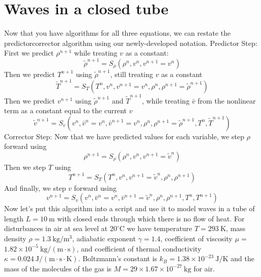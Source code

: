 \section*{Waves in a closed tube}

Now that you have algorithms for all three equations, we can restate the predictorcorrector algorithm using our newly-developed notation.
Predictor Step: First we predict $\rho^{n+1}$ while treating $v$ as a constant:
$$
\tilde{\rho}^{n+1}=S_{\rho}\left(\rho^{n}, v^{n}, v^{n+1}=v^{n}\right)
$$
Then we predict $T^{n+1}$ using $\tilde{\rho}^{n+1}$, still treating $v$ as a constant
$$
\tilde{T}^{n+1}=S_{T}\left(T^{n}, v^{n}, v^{n+1}=v^{n}, \rho^{n}, \rho^{n+1}=\tilde{\rho}^{n+1}\right)
$$
Then we predict $v^{n+1}$ using $\tilde{\rho}^{n+1}$ and $\tilde{T}^{n+1}$, while treating $\bar{v}$ from the nonlinear term as a constant equal to the current $v$
$$
\tilde{v}^{n+1}=S_{v}\left(v^{n}, \bar{v}^{n}=v^{n}, \bar{v}^{n+1}=v^{n}, \rho^{n}, \rho^{n+1}=\tilde{\rho}^{n+1}, T^{n}, \tilde{T}^{n+1}\right)
$$
Corrector Step: Now that we have predicted values for each variable, we step $\rho$ forward using
$$
\rho^{n+1}=S_{\rho}\left(\rho^{n}, v^{n}, v^{n+1}=\tilde{v}^{n}\right)
$$
Then we step $T$ using
$$
T^{n+1}=S_{T}\left(T^{n}, v^{n}, v^{n+1}=\tilde{v}^{n}, \rho^{n}, \rho^{n+1}\right)
$$
And finally, we step $v$ forward using
$$
v^{n+1}=S_{v}\left(v^{n}, \bar{v}^{n}=v^{n}, \bar{v}^{n+1}=\tilde{v}^{n}, \rho^{n}, \rho^{n+1}, T^{n}, T^{n+1}\right)
$$
Now let\rq s put this algorithm into a script and use it to model waves in a tube of length $L=10 \mathrm{~m}$ with closed ends through which there is no flow of heat. For disturbances in air at sea level at $20^{\circ} \mathrm{C}$ we have temperature $T=293 \mathrm{~K}$, mass density $\rho=1.3 \mathrm{~kg} / \mathrm{m}^{3}$, adiabatic exponent $\gamma=1.4$, coefficient of viscosity $\mu=$ $1.82 \times 10^{-5} \mathrm{~kg} /(\mathrm{m} \cdot \mathrm{s})$, and coefficient of thermal conductivity $\kappa=0.024 \mathrm{~J} /(\mathrm{m} \cdot \mathrm{s} \cdot \mathrm{K})$. Boltzmann\rq s constant is $k_{B}=1.38 \times 10^{-23} \mathrm{~J} / \mathrm{K}$ and the mass of the molecules of the gas is $M=29 \times 1.67 \times 10^{-27} \mathrm{~kg}$ for air.

